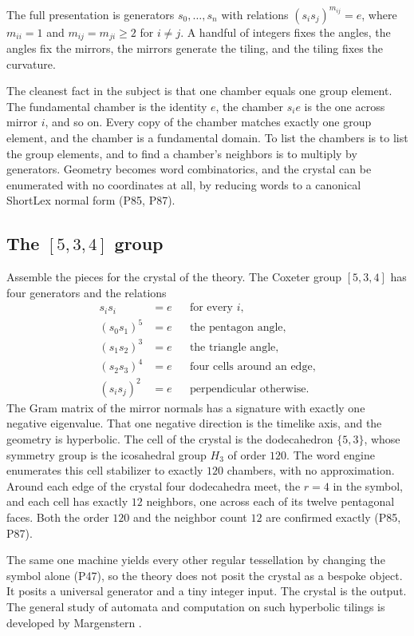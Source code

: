 The full presentation is generators $s_0, \dots, s_n$ with relations $(s_i s_j)^{m_{ij}} = e$, where
$m_{ii} = 1$ and $m_{ij} = m_{ji} \ge 2$ for $i \ne j$. A handful of integers fixes the angles, the angles
fix the mirrors, the mirrors generate the tiling, and the tiling fixes the curvature.

The cleanest fact in the subject is that one chamber equals one group element. The fundamental chamber is
the identity $e$, the chamber $s_i e$ is the one across mirror $i$, and so on. Every copy of the chamber
matches exactly one group element, and the chamber is a fundamental domain. To list the chambers is to list
the group elements, and to find a chamber's neighbors is to multiply by generators. Geometry becomes word
combinatorics, and the crystal can be enumerated with no coordinates at all, by reducing words to a
canonical ShortLex normal form (P85, P87).

\subsection{The $[5,3,4]$ group}

Assemble the pieces for the crystal of the theory. The Coxeter group $[5,3,4]$ has four generators and the
relations
\begin{align}
s_i s_i &= e && \text{for every } i, \\
(s_0 s_1)^5 &= e && \text{the pentagon angle}, \\
(s_1 s_2)^3 &= e && \text{the triangle angle}, \\
(s_2 s_3)^4 &= e && \text{four cells around an edge}, \\
(s_i s_j)^2 &= e && \text{perpendicular otherwise}.
\end{align}
The Gram matrix of the mirror normals has a signature with exactly one negative eigenvalue. That one
negative direction is the timelike axis, and the geometry is hyperbolic. The cell of the crystal is the
dodecahedron $\{5,3\}$, whose symmetry group is the icosahedral group $H_3$ of order $120$. The word engine
enumerates this cell stabilizer to exactly $120$ chambers, with no approximation. Around each edge of the
crystal four dodecahedra meet, the $r = 4$ in the symbol, and each cell has exactly $12$ neighbors, one
across each of its twelve pentagonal faces. Both the order $120$ and the neighbor count $12$ are confirmed
exactly (P85, P87).

The same one machine yields every other regular tessellation by changing the symbol alone (P47), so the
theory does not posit the crystal as a bespoke object. It posits a universal generator and a tiny integer
input. The crystal is the output. The general study of automata and computation on such hyperbolic tilings
is developed by Margenstern \cite{margenstern2013}.

